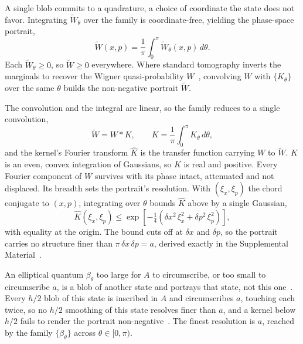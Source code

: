 \documentclass[aps,prl,reprint,amsmath,amssymb,floatfix,nofootinbib]{revtex4-2}
\begin{document}

A single blob commits to a quadrature, a choice of coordinate the state does not favor. Integrating $\widetilde W_\theta$ over the family is coordinate-free, yielding the phase-space portrait,
\begin{equation}
\widetilde{W}(x,p) = \frac{1}{\pi}\int_0^\pi \widetilde W_\theta(x,p)\,d\theta.
\label{eq:tildeW}
\end{equation}
Each $\widetilde W_\theta \ge 0$, so $\widetilde W \ge 0$ everywhere. Where standard tomography inverts the marginals to recover the Wigner quasi-probability $W$~\cite{vogelrisken1989,lvovsky2009}, convolving $W$ with $\{K_\theta\}$ over the same $\theta$ builds the non-negative portrait $\widetilde W$.

The convolution and the integral are linear, so the family reduces to a single convolution,
\begin{equation}
\widetilde W = W * K, \qquad K = \frac{1}{\pi}\int_0^\pi K_\theta\,d\theta,
\label{eq:Kquorum}
\end{equation}
and the kernel's Fourier transform $\widehat K$ is the transfer function carrying $W$ to $\widetilde W$. $K$ is an even, convex integration of Gaussians, so $\widehat K$ is real and positive. Every Fourier component of $W$ survives with its phase intact, attenuated and not displaced. Its breadth sets the portrait's resolution. With $(\xi_x,\xi_p)$ the chord conjugate to $(x,p)$, integrating over $\theta$ bounds $\widehat K$ above by a single Gaussian,
\begin{equation}
\widehat{K}(\xi_x,\xi_p) \le \exp\!\left[ -\tfrac14\!\left( \delta x^{2}\,\xi_x^{2} + \delta p^{2}\,\xi_p^{2} \right) \right],
\label{eq:transfer}
\end{equation}
with equality at the origin. The bound cuts off at $\delta x$ and $\delta p$, so the portrait carries no structure finer than $\pi\,\delta x\,\delta p = a$, derived exactly in the Supplemental Material~\cite{zenododeposit}.

An elliptical quantum $\beta_\theta$ too large for $A$ to circumscribe, or too
small to circumscribe $a$, is a blob of another state and
portrays that state, not this one~\cite{degosson2013qblobs,
degosson2022polar}. Every $h/2$ blob of this state is inscribed in $A$
and circumscribes $a$, touching each twice, so no $h/2$ smoothing of this
state resolves finer than $a$, and a kernel below $h/2$ fails to render
the portrait non-negative~\cite{cartwright1976,degosson2005bullsci}.
The finest resolution is $a$, reached by the family $\{\beta_\theta\}$
across $\theta \in [0,\pi)$.
\end{document}
